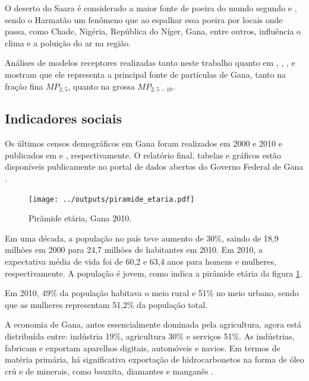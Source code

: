 O deserto do Saara é considerado a maior fonte de poeira do mundo segundo 
\citet{breuning2005} e \citet{prospero2002}, sendo o Harmatão um fenômeno que 
ao espalhar essa poeira por locais onde passa, como Chade, Nigéria, 
República do Níger, Gana, entre outros, influência o clima e a poluição do ar 
na região.

Análises de modelos receptores 
realizadas tanto neste trabalho quanto em \citet{aboh2009}, \citet{dionisio2010b}, 
\citet{zhou2011}, \citet{ofosu2012} e \citet{rooney2012} mostram que ele 
representa a principal 
fonte de partículas de Gana, tanto na fração fina $MP_{2,5}$, quanto na grossa 
$MP_{2,5-10}$.

\subsection{Indicadores sociais}

Os últimos censos demográficos em Gana foram realizados em 2000 e 2010 
e publicados em \citeyear{ghanacensus2003} e \citeyear{ghanacensus2013}, 
respectivamente. O relatório final, tabelas e gráficos estão disponíveis
publicamente no portal de dados abertos do Governo Federal de Gana 
\citep{opendataghana}.

\begin{figure}
  \centering
  \texttt{[image: ../outputs/piramide\_etaria.pdf]}
  \caption{Pirâmide etária, Gana 2010. \citep{ghanacensus2013} 
           \label{fig:piramedegana}}
\end{figure}

Em uma década, a população no país teve aumento de 30\%, saindo de 18,9 milhões em 
2000 para 24,7 milhões de habitantes em 2010. Em 2010, a expectativa média de 
vida foi de 60,2 e 63,4 anos para homens e mulheres, respectivamente.
A população é jovem, como indica a pirâmide etária da figura \ref{fig:piramedegana}.

Em 2010, 49\% da população habitava o meio rural e 51\% no meio urbano, 
sendo que as mulheres representam 51,2\% da população total.

A economia de Gana, antes essencialmente dominada pela agricultura, 
agora está distribuída entre: indústria 19\%, agricultura 30\% 
e serviços 51\%. As indústrias, fabricam e exportam aparelhos digitais, 
automóveis e navios. Em termos de matéria primária, há significativa 
exportação de hidrocarbonetos na forma de óleo crú e de minerais,
como bauxita, diamantes e manganês \citep{ghanacensus2013}.
  
